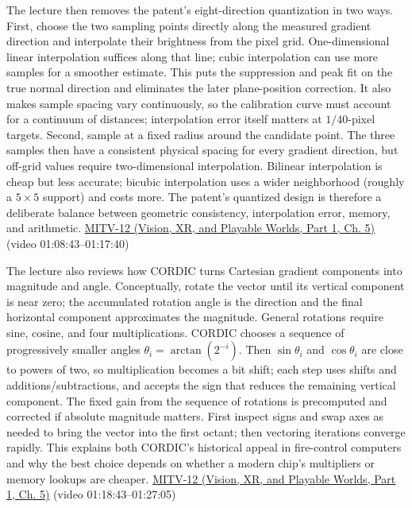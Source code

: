 The lecture then removes the patent's eight-direction quantization in two ways. First, choose the two sampling points directly along the measured gradient direction and interpolate their brightness from the pixel grid. One-dimensional linear interpolation suffices along that line; cubic interpolation can use more samples for a smoother estimate. This puts the suppression and peak fit on the true normal direction and eliminates the later plane-position correction. It also makes sample spacing vary continuously, so the calibration curve must account for a continuum of distances; interpolation error itself matters at \(1/40\)-pixel targets. Second, sample at a fixed radius around the candidate point. The three samples then have a consistent physical spacing for every gradient direction, but off-grid values require two-dimensional interpolation. Bilinear interpolation is cheap but less accurate; bicubic interpolation uses a wider neighborhood (roughly a \(5\times5\) support) and costs more. The patent's quantized design is therefore a deliberate balance between geometric consistency, interpolation error, memory, and arithmetic. \href{../07-Vision-XR-and-Playable-Worlds-P01/main.pdf\#nameddest=04-visual-computing-ii-ch036-mitv-12---blob-analysis-binary-image-processing-greens-theorem-derivative-and-integral}{MITV-12 (Vision, XR, and Playable Worlds, Part 1, Ch. 5)} (video 01:08:43--01:17:40)

The lecture also reviews how CORDIC turns Cartesian gradient components into magnitude and angle. Conceptually, rotate the vector until its vertical component is near zero; the accumulated rotation angle is the direction and the final horizontal component approximates the magnitude. General rotations require sine, cosine, and four multiplications. CORDIC chooses a sequence of progressively smaller angles \(\theta_i=\arctan(2^{-i})\). Then \(\sin\theta_i\) and \(\cos\theta_i\) are close to powers of two, so multiplication becomes a bit shift; each step uses shifts and additions/subtractions, and accepts the sign that reduces the remaining vertical component. The fixed gain from the sequence of rotations is precomputed and corrected if absolute magnitude matters. First inspect signs and swap axes as needed to bring the vector into the first octant; then vectoring iterations converge rapidly. This explains both CORDIC's historical appeal in fire-control computers and why the best choice depends on whether a modern chip's multipliers or memory lookups are cheaper. \href{../07-Vision-XR-and-Playable-Worlds-P01/main.pdf\#nameddest=04-visual-computing-ii-ch036-mitv-12---blob-analysis-binary-image-processing-greens-theorem-derivative-and-integral}{MITV-12 (Vision, XR, and Playable Worlds, Part 1, Ch. 5)} (video 01:18:43--01:27:05)

